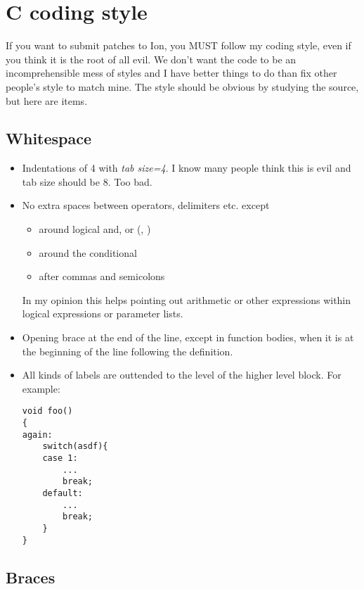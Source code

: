 \section{C coding style}

If you want to submit patches to Ion, you MUST follow my coding 
style, even if you think it is the root of all evil. We don't want
the code to be an incomprehensible mess of styles and I have better
things to do than fix other people's style to match mine. The style
should be obvious by studying the source, but here are items.

\subsection{Whitespace}

\begin{itemize}
  \item Indentations of 4 with \emph{tab size=4}. I know many people
    think this is evil and tab size should be 8. Too bad.
    
  \item No extra spaces between operators, delimiters etc. except
    \begin{itemize}
      \item around logical and, or (\code{&&}, \code{||})
      \item around the conditional 
      \item after commas and semicolons
    \end{itemize}  
    In my opinion this helps pointing out arithmetic or other
    expressions within logical expressions or parameter lists.
    
  \item Opening brace at the end of the line, except in function
    bodies, when it is at the beginning of the line following
    the definition.

  \item All kinds of labels are outtended to the level of the higher
    level block. For example:

\begin{verbatim}    
void foo()
{
again:
    switch(asdf){
    case 1:
        ...
        break;
    default:
        ...
        break;
    }
}
\end{verbatim}
\end{itemize}

\subsection{Braces}

